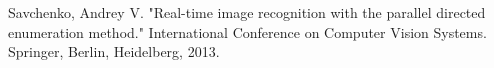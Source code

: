 \cleardoublepage
{}
{}
\begin{thebibliography}{99}

Savchenko, Andrey V. "Real-time image recognition with the parallel directed enumeration method." International Conference on Computer Vision Systems. Springer, Berlin, Heidelberg, 2013.
\end{thebibliography}
